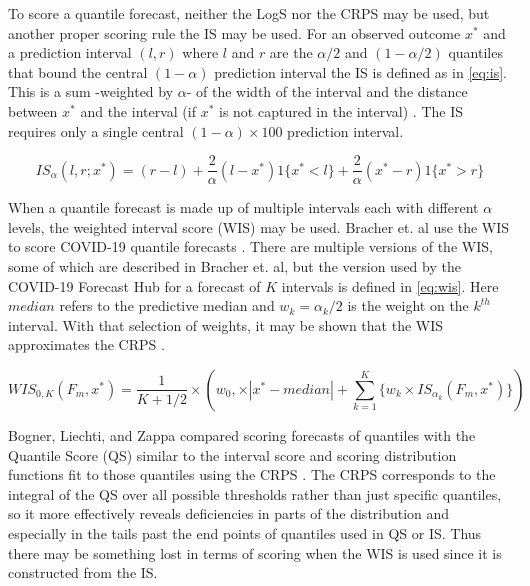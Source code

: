 \documentclass[11pt,notitlepage]{isuthesis}
\begin{document}
To score a quantile forecast, 
neither the LogS nor the CRPS may be used, 
but another proper scoring rule the IS may be used.
For an observed outcome $x^*$ and a prediction interval $(l,r)$ 
where $l$ and $r$ are the $\alpha/2$ and $(1-\alpha/2)$ quantiles that bound
the central $(1-\alpha)$ prediction interval the IS is defined as 
in \eqref{eq:is}.
This is a sum -weighted by 
$\alpha$- of the width of the
interval and the distance between $x^*$ and the interval (if $x^*$ is not 
captured in the interval) \cite[]{gneiting2014probabilistic}. 
The IS requires only a single central 
$(1-\alpha) \times 100$ prediction interval.

\begin{equation}
\label{eq:is}
  IS_{\alpha}(l,r; x^*) = (r-l) + \frac{2}{\alpha}(l-x^*)1\{x^*<l\} 
  + \frac{2}{\alpha}(x^*-r)1\{x^* > r\}
\end{equation}


When a quantile forecast is made up of multiple intervals each with different
$\alpha$ levels, the weighted interval score (WIS) may be used.
Bracher et.
al use the WIS to score COVID-19 quantile forecasts 
\cite[]{bracher2021evaluating}.
There are multiple versions of the WIS, some of 
which are described in Bracher et. al, but the version used by the COVID-19 
Forecast
Hub for a forecast of $K$ intervals is defined in \eqref{eq:wis}.
Here $median$ refers to the predictive median and $w_k = \alpha_k/2$ is the 
weight on the $k^{th}$
interval. With that selection of weights, it may be shown that the
WIS approximates the CRPS \cite[see S1 Text therein]{bracher2021evaluating}.

\begin{equation}
\label{eq:wis}
  WIS_{0,K}(F_m,x^*) = \frac{1}{K + 1/2} \times (w_0, \times |x^*-median|+
  \sum_{k=1}^K \{ w_k \times IS_{\alpha_k}(F_m,x^*) \} )
\end{equation}


Bogner, Liechti, and Zappa compared scoring forecasts of quantiles with the 
Quantile Score (QS) similar to the interval score and scoring distribution functions
fit to those quantiles using the CRPS \cite[]{bogner2017combining}. The CRPS 
corresponds to the integral of the QS over all possible thresholds rather than
just specific quantiles, so it more effectively reveals deficiencies in parts of 
the distribution and especially in the tails past the end points of quantiles
used in QS or IS. Thus there may be something lost in terms of scoring when the 
WIS is used since it is constructed from the IS.
\end{document}
